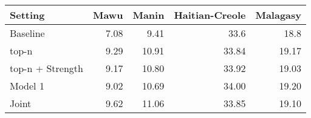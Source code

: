 \begin{tabular}{lrrrr}
\toprule
Setting & Mawu & Manin & Haitian-Creole & Malagasy \\
\toprule
Baseline & 7.08 & 9.41 & 33.6 & 18.8 \\
top-n & 9.29 & 10.91 & 33.84 & 19.17 \\
top-n + Strength & 9.17  & 10.80 & 33.92 & 19.03 \\
Model 1 & 9.02 & 10.69 & 34.00 & 19.20 \\
Joint & 9.62 & 11.06 & 33.85 & 19.10 \\
\bottomrule
\end{tabular}